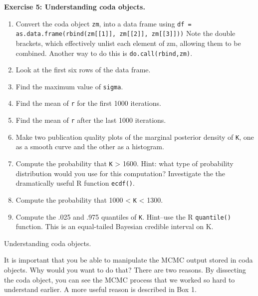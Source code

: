 \documentclass[12pt,english]{article}
\begin{document}
\belowcaptionskip=-30pt
\begin{exercise}

\begin{mdframed}
\doublespacing
\textbf{Exercise 5: Understanding coda objects.}
\begin{enumerate}
\item Convert the coda object \texttt{zm}, into a data frame using \texttt{df = as.data.frame(rbind(zm[[1]], zm[[2]], zm[[3]]))}  Note the double brackets, which effectively unlist each element of zm, allowing them to be combined. Another way to do this is \texttt{do.call(rbind,zm)}.
\item Look at the first six rows of the data frame.
\item Find the maximum value of \texttt{sigma}.
\item Find the mean of \texttt{r} for the first 1000 iterations.
\item Find the mean of \texttt{r} after the last 1000 iterations.
\item Make two publication quality plots of the marginal posterior density of \texttt{K}, one as a smooth curve and the other as a histogram.
\item Compute the probability that \texttt{K} > 1600. Hint: what type of probability distribution would you use for this computation?  Investigate the the dramatically useful R function \texttt{ecdf()}.
\item Compute the probability that 1000 < \texttt{K} < 1300.
\item Compute the .025 and .975 quantiles of \texttt{K}.  Hint--use the R \texttt{quantile()} function. This is an equal-tailed Bayesian credible interval on K.
\end{enumerate}
\end{mdframed}
\captionsetup{textformat=empty, labelformat=empty}
\caption[Understanding coda objects]{Understanding coda objects.}
\label{ex:coda understanding}
\end{exercise}
\belowcaptionskip=0pt

It is important that you be able to manipulate the MCMC output stored in coda objects. Why would you want to do that? There are two reasons. By dissecting the coda object, you can see the MCMC process that we worked so hard to understand earlier. A more useful reason is described in Box 1.
\end{document}
